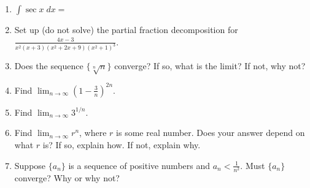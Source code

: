 \documentclass{exam}[12pt]
\begin{document}
{\begin{enumerate}
\item $\displaystyle \int \sec x \; dx = $
\vspace{.2in}
\item Set up (do not solve) the partial fraction decomposition for 
$\displaystyle \frac{4x -3 }{x^2(x+3)(x^2+2x+9)(x^2+1)^3}$.
\vspace{.2in}

\item Does the sequence $\{ \sqrt[n] n\}$ converge?  If so, what
is the limit?  If not, why not?
\vspace{.2in}

\item Find $\displaystyle \lim_{n\to\infty} \left( 1 -\frac{3}{n}\right)^{2n}$.
\vspace{.2in}

\item Find $\displaystyle \lim_{n\to\infty} 3^{1/n}$.
\vspace{.2in}

\item Find $\displaystyle\lim_{n\to\infty} r^n$, where $r$ is some real number.
Does your answer depend on what $r$ is?  If so, explain how.  If not, 
explain why.

\vspace{.2in}

\item Suppose $\{a_n\}$ is a sequence of positive numbers and $a_n <
\frac{1}{n^2}$.  Must $\{a_n\}$ converge?  Why or why not?

\end{enumerate}


}
\end{document}
